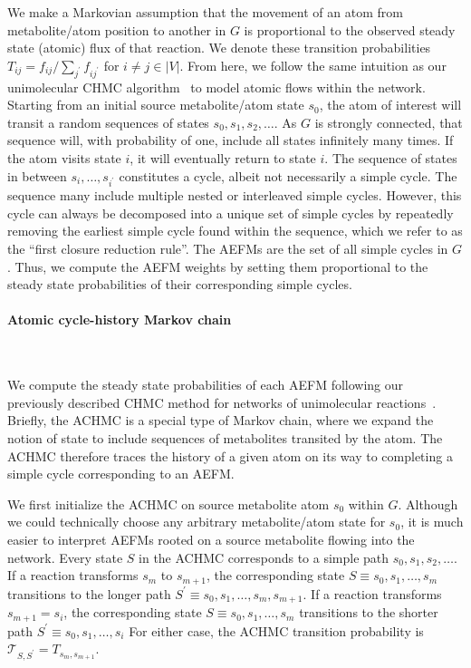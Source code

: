 \documentclass[12pt]{article}
\begin{document}
We make a Markovian assumption that the movement of an atom from
metabolite/atom position to another in $G$ is proportional to the observed
steady state (atomic) flux of that reaction. We denote these transition
probabilities $T_{ij} = f_{ij} / \sum_{j^{\prime}}f_{ij^{\prime}}$ for $i
\neq j \in |V|$. From here, we follow the same intuition as our
unimolecular CHMC algorithm~\citep{ChitpinJustinG2023AMct} to model atomic
flows within the network. Starting from an initial source metabolite/atom
state $s_0$, the atom of interest will transit a random sequences of
states $s_0, s_1, s_2, \ldots$. As $G$ is strongly connected, that
sequence will, with probability of one, include all states infinitely many
times. If the atom visits state $i$, it will eventually return to state
$i$. The sequence of states in between $s_i, \ldots, s_{i^{\prime}}$
constitutes a cycle, albeit not necessarily a simple cycle. The sequence
many include multiple nested or interleaved simple cycles. However, this
cycle can always be decomposed into a unique set of simple cycles by
repeatedly removing the earliest simple cycle found within the sequence,
which we refer to as the ``first closure reduction rule''. The AEFMs are
the set of all simple cycles in $G$. Thus, we compute the AEFM
weights by setting them proportional to the steady state probabilities of
their corresponding simple cycles.

\paragraph*{Atomic cycle-history Markov chain}

\hspace*{0.1cm}\\\noindent

We compute the steady state probabilities of each AEFM following our
previously described CHMC method for networks of unimolecular
reactions~\citep{ChitpinJustinG2023AMct}. Briefly, the ACHMC is a special
type of Markov chain, where we expand the notion of state to include
sequences of metabolites transited by the atom. The ACHMC therefore traces
the history of a given atom on its way to completing a simple cycle
corresponding to an AEFM.

We first initialize the ACHMC on source metabolite atom $s_0$ within
$G$. Although we could technically choose any arbitrary metabolite/atom
state for $s_0$, it is much easier to interpret AEFMs rooted on
a source metabolite flowing into the network. Every state $S$ in the ACHMC
corresponds to a simple path $s_0, s_1, s_2, \ldots$. If a reaction
transforms $s_m$ to $s_{m+1}$, the corresponding state $S \equiv s_0, s_1,
\ldots, s_m$ transitions to the longer path $S^{\prime} \equiv s_0, s_1,
\ldots, s_m, s_{m+1}$. If a reaction transforms $s_{m+1} = s_i$, the
corresponding state $S \equiv s_0, s_1,\ldots, s_m$ transitions to the
shorter path $S^{\prime} \equiv s_0, s_1, \ldots, s_i$ For either case,
the ACHMC transition probability is $\mathcal{T}_{S,S^{\prime}}
= T_{s_m,s_{m+1}}$.
\end{document}
